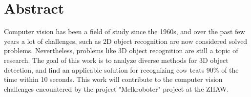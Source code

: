 \chapter*{Abstract}

Computer vision has been a field of study since the 1960s, and over the past few years a lot of challenges, such as 2D object recognition are now considered solved problems. Nevertheless, problems like 3D object recognition are still a topic of research. 
The goal of this work is to analyze diverse methods for 3D object detection, and find an applicable solution for recognizing cow teats 90\% of the time within 10 seconds. 
This work will contribute to the computer vision challenges encountered by the project "Melkroboter" project at the ZHAW.